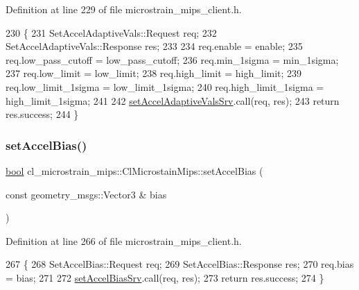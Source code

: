 Definition at line 229 of file microstrain\+\_\+mips\+\_\+client.\+h.


\begin{DoxyCode}
230     \{
231         SetAccelAdaptiveVals::Request req;
232         SetAccelAdaptiveVals::Response res;
233 
234         req.enable = enable;
235         req.low\_pass\_cutoff = low\_pass\_cutoff;
236         req.min\_1sigma = min\_1sigma;
237         req.low\_limit = low\_limit;
238         req.high\_limit = high\_limit;
239         req.low\_limit\_1sigma = low\_limit\_1sigma;
240         req.high\_limit\_1sigma = high\_limit\_1sigma;
241 
242         \hyperlink{classcl__microstrain__mips_1_1ClMicrostainMips_a0e22727b68e51261aa65605f236419e6}{setAccelAdaptiveValsSrv}.call(req, res);
243         \textcolor{keywordflow}{return} res.success;
244     \}
\end{DoxyCode}
\mbox{\label{classcl__microstrain__mips_1_1ClMicrostainMips_a535b7afce9ff4288c94077fe8fc30f79}} 
\subsubsection{\texorpdfstring{set\+Accel\+Bias()}{setAccelBias()}}
{\footnotesize\ttfamily \hyperlink{classbool}{bool} cl\+\_\+microstrain\+\_\+mips\+::\+Cl\+Microstain\+Mips\+::set\+Accel\+Bias (\begin{DoxyParamCaption}\item[{const geometry\+\_\+msgs\+::\+Vector3 \&}]{bias }\end{DoxyParamCaption})\hspace{0.3cm}{\ttfamily [inline]}}



Definition at line 266 of file microstrain\+\_\+mips\+\_\+client.\+h.


\begin{DoxyCode}
267     \{
268         SetAccelBias::Request req;
269         SetAccelBias::Response res;
270         req.bias = bias;
271 
272         \hyperlink{classcl__microstrain__mips_1_1ClMicrostainMips_ae2ea11655cba06e49307780d1f95e197}{setAccelBiasSrv}.call(req, res);
273         \textcolor{keywordflow}{return} res.success;
274     \}
\end{DoxyCode}
\mbox{\label{classcl__microstrain__mips_1_1ClMicrostainMips_a809131028b774a3026a3f6894db0dc8f}} 
